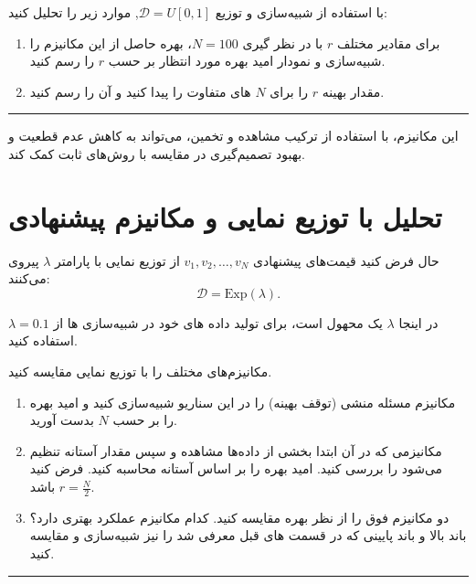 \documentclass[a4paper]{article}
\begin{document}
\vspace{5mm}{\color{SimQColor}\hrule}
\begin{SimQuestion}
با استفاده از شبیه‌سازی  و توزیع $\mathcal{D}=U[0,1]$, موارد زیر را تحلیل کنید:

\begin{enumerate}
    \item برای مقادیر مختلف $r$ با در نظر گیری $N=100$، بهره حاصل از این مکانیزم را شبیه‌سازی و نمودار امید بهره مورد انتظار بر حسب $r$ را رسم کنید.  
    \item مقدار بهینه $r$ را برای $N$ های متفاوت را پیدا کنید و آن را رسم کنید.
\end{enumerate}
\end{SimQuestion}
{\color{SimQColor}\hrule}\vspace{5mm}  

این مکانیزم، با استفاده از ترکیب مشاهده و تخمین، می‌تواند به کاهش عدم قطعیت و بهبود تصمیم‌گیری در مقایسه با روش‌های ثابت کمک کند.

\section{تحلیل با توزیع نمایی و مکانیزم پیشنهادی}

حال فرض کنید قیمت‌های پیشنهادی $v_1, v_2, \dots, v_N$ از توزیع نمایی با پارامتر $\lambda$ پیروی می‌کنند: 
\[
\mathcal{D} = \text{Exp}(\lambda).
\]

در اینجا $\lambda$ یک محهول است، برای تولید داده های خود در شبیه‌سازی ها از $\lambda=0.1$ استفاده کنید.

\vspace{5mm}{\color{SimQColor}\hrule}
\begin{SimQuestion}
	
مکانیزم‌های مختلف را با توزیع نمایی مقایسه کنید.

\begin{enumerate}
    \item مکانیزم مسئله منشی (توقف بهینه) را در این سناریو شبیه‌سازی کنید و امید بهره را بر حسب $N$ بدست آورید.
    \item مکانیزمی که در آن ابتدا بخشی از داده‌ها مشاهده و سپس مقدار آستانه تنظیم می‌شود را بررسی کنید. امید بهره را بر اساس آستانه محاسبه کنید. فرض کنید $r=\frac{N}{2}$ باشد.
    \item دو مکانیزم فوق را از نظر بهره مقایسه کنید. کدام مکانیزم عملکرد بهتری دارد؟ باند بالا و باند پایینی که در قسمت های قبل معرفی شد را نیز شبیه‌سازی و مقایسه کنید.
\end{enumerate}
\end{SimQuestion}
{\color{SimQColor}\hrule}\vspace{5mm}
\end{document}
